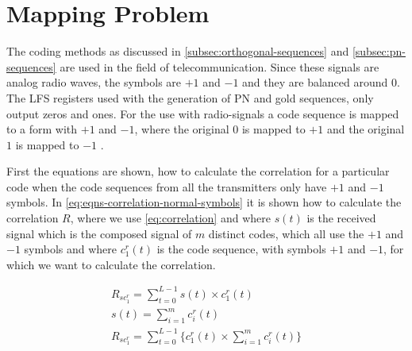 
\section{Mapping Problem}
\label{sec:mapping-problem}

The coding methods as discussed in \autoref{subsec:orthogonal-sequences} and \autoref{subsec:pn-sequences} are used in the field of telecommunication.
Since these signals are analog radio waves, the symbols are $+1$ and $-1$ and they are balanced around $0$.
The LFS registers used with the generation of PN and gold sequences, only output zeros and ones.
For the use with radio-signals a code sequence is mapped to a form with $+1$ and $-1$, where the original $0$ is mapped to $+1$ and the original $1$ is mapped to $-1$ \cite{cdma-mapping-symbols-ref}.



First the equations are shown, how to calculate the correlation for a particular code when the code sequences from all the transmitters only have $+1$ and $-1$ symbols. 
In \autoref{eq:eqns-correlation-normal-symbols} it is shown how to calculate the correlation $R$, where we use \autoref{eq:correlation} and where $s(t)$ is the received signal which is the composed signal of $m$ distinct codes, which all use the $+1$ and $-1$ symbols and where $c^r_1(t)$ is the code sequence, with symbols $+1$ and $-1$, for which we want to calculate the correlation.


\begin{equation}
	\begin{array}{l}
		R_{sc^r_{1}} = \displaystyle\sum_{t = 0} ^ {L - 1} s(t) \times c^r_1(t)	 \\
		s(t) = \displaystyle\sum_{i = 1} ^ {m} c^r_i(t) \\
		R_{sc^r_{1}} = \displaystyle\sum_{t = 0} ^ {L - 1} \Bigg\{ c^r_1(t) \times  \displaystyle\sum_{i = 1} ^ {m} c^r_i(t) \Bigg\} 
	\end{array} 
	\label{eq:eqns-correlation-normal-symbols}
\end{equation}



